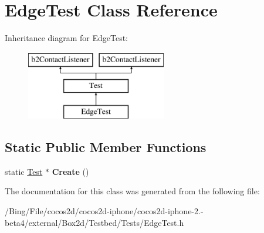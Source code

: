 \hypertarget{class_edge_test}{\section{Edge\-Test Class Reference}
\label{class_edge_test}
}
Inheritance diagram for Edge\-Test\-:\begin{figure}[H]
\begin{center}
\leavevmode
\includegraphics[height=3.000000cm]{class_edge_test}
\end{center}
\end{figure}
\subsection*{Static Public Member Functions}
\begin{DoxyCompactItemize}
\item 
\hypertarget{class_edge_test_a5d2f628fa1dd1eb35b5878faa835273a}{static \hyperlink{class_test}{Test} $\ast$ {\bfseries Create} ()}\label{class_edge_test_a5d2f628fa1dd1eb35b5878faa835273a}

\end{DoxyCompactItemize}


The documentation for this class was generated from the following file\-:\begin{DoxyCompactItemize}
\item 
/\-Bing/\-File/cocos2d/cocos2d-\/iphone/cocos2d-\/iphone-\/2.-\/beta4/external/\-Box2d/\-Testbed/\-Tests/Edge\-Test.\-h\end{DoxyCompactItemize}
